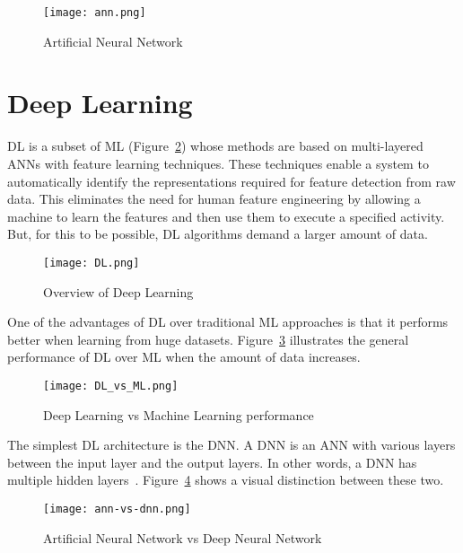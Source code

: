     \begin{figure}[htbp]
        \centering
        \texttt{[image: ann.png]}
        \caption{Artificial Neural Network~\cite{CastrounisAIExplained}}
        \label{fig:ann}
    \end{figure}

\section{Deep Learning}\label{sec:dl}

\gls{DL} is a subset of \gls{ML} (Figure~\ref{fig:DL}) whose methods are based on multi-layered \gls{ANN}s with feature learning techniques. These techniques enable a system to automatically identify the representations required for feature detection from raw data. This eliminates the need for human feature engineering by allowing a machine to learn the features and then use them to execute a specified activity. But, for this to be possible, \gls{DL} algorithms demand a larger amount of data.

\begin{figure}[htbp]
    \centering
    \texttt{[image: DL.png]}
    \caption{Overview of Deep Learning~\cite{Alzubaidi2021ReviewDirections}}
    \label{fig:DL}
\end{figure}

One of the advantages of \gls{DL} over traditional \gls{ML} approaches is that it performs better when learning from huge datasets. Figure~\ref{fig:DL_vs_ML} illustrates the general performance of \gls{DL} over \gls{ML} when the amount of data increases.

\begin{figure}[htbp]
    \centering
    \texttt{[image: DL\_vs\_ML.png]}
    \caption{Deep Learning vs Machine Learning performance~\cite{Alom2019AArchitectures}}
    \label{fig:DL_vs_ML}
\end{figure}

The simplest \gls{DL} architecture is the \gls{DNN}. A \gls{DNN} is an \gls{ANN} with various layers between the input layer and the output layers. In other words, a \gls{DNN} has multiple hidden layers~\cite{Schmidhuber2015DeepOverview}. Figure~\ref{fig:ann-vs-dnn} shows a visual distinction between these two.

\begin{figure}[htbp]
    \centering
    \texttt{[image: ann-vs-dnn.png]}
    \caption{Artificial Neural Network vs Deep Neural Network~\cite{Mostafa2020MachineArticle}}
    \label{fig:ann-vs-dnn}
\end{figure}

